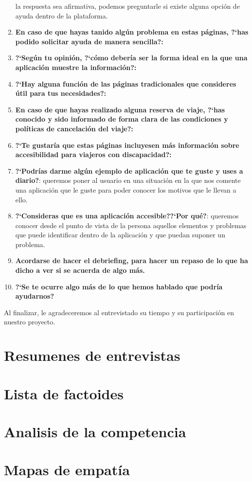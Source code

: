\begin{enumerate}
                la respuesta sea afirmativa, podemos preguntarle si existe alguna opción de ayuda dentro de la plataforma.
    \item {\textbf{En caso de que hayas tanido algún problema en estas páginas, ?`has podido solicitar ayuda de manera sencilla?:}}
    \item {\textbf{?`Según tu opinión, ?`cómo debería ser la forma ideal en la que una aplicación muestre la información?:}}
    \item {\textbf{?`Hay alguna función de las páginas tradicionales que consideres útil para tus necesidades?:}}
    \item {\textbf{En caso de que hayas realizado alguna reserva de viaje, ?`has conocido y sido informado de forma clara de las condiciones
                        y políticas de cancelación del viaje?:}}
    \item {\textbf{?`Te gustaría que estas páginas incluyesen más información sobre accesibilidad para viajeros con discapacidad?:}}
    \item {\textbf{?`Podrías darme algún ejemplo de aplicación que te guste y uses a diario?}}: queremos poner al usuario en una situación
    en la que nos comente una aplicación que le guste para poder conocer los motivos que le llevan a ello.
    \item {\textbf{?`Consideras que es una aplicación accesible??`Por qué?}}: queremos conocer desde el punto de vista de la persona aquellos
    elementos y problemas que puede identificar dentro de la aplicación y que puedan suponer un problema.
    \item {\textbf{Acordarse de hacer el debriefing, para hacer un repaso de lo que ha dicho a ver si se acuerda de algo más.}}
    \item {\textbf{?`Se te ocurre algo más de lo que hemos hablado que podría ayudarnos?}}
\end{enumerate}

Al finalizar, le agradeceremos al entrevistado su tiempo y su participación en nuestro proyecto.


\section{Resumenes de entrevistas}

\section{Lista de factoides}

\section{Analisis de la competencia}

\section{Mapas de empatía}
